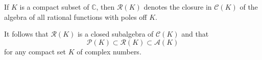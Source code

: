 If $K$ is a compact subset of $\mathbb{C}$, then $\mathcal{R}(K)$ denotes the closure in $\mathcal{C}(K)$ of the algebra of all rational functions with poles off $K$.

It follows that $\mathcal{R}(K)$ is a closed subalgebra of $\mathcal{C}(K)$ and that
$$\mathcal{P}(K) \subset \mathcal{R}(K) \subset \mathcal{A}(K)$$
for any compact set $K$ of complex numbers.
